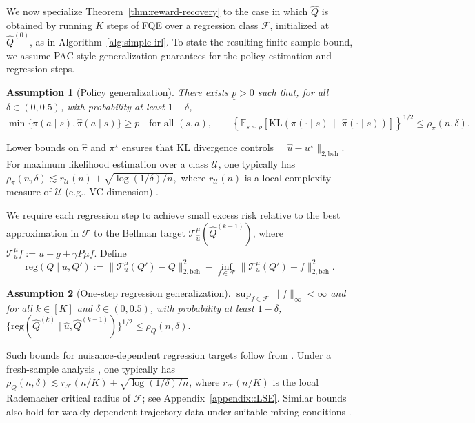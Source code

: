 \documentclass{article}
\newtheorem{assumption}{Assumption}
\newcommand{\E}{\mathbb{E}}
\newcommand{\1}{\mathbbm{1}}
\begin{document}
We now specialize Theorem~\ref{thm:reward-recovery} to the case in which
\(\hat Q\) is obtained by running \(K\) steps of FQE over a regression class
\(\mathcal F\), initialized at \(\hat Q^{(0)}\), as in
Algorithm~\ref{alg:simple-irl}. To state the resulting finite-sample bound, we
assume PAC-style generalization guarantees for the policy-estimation and
regression steps.
\begin{assumption}[Policy generalization]
\label{assump:policy-gen}
There exists \(\underline p>0\) such that, for all \(\delta\in(0,0.5)\), with
probability at least \(1-\delta\),
\[
\min\{\pi(a\mid s),\hat\pi(a\mid s)\}\ge \underline p
\quad\text{for all }(s,a),
\qquad
\left\{
\E_{s\sim\rho}\!\left[
\mathrm{KL}\!\left(\pi(\cdot\mid s)\,\|\,\hat\pi(\cdot\mid s)\right)
\right]
\right\}^{1/2}
\le
\rho_\pi(n,\delta).
\]
\end{assumption}
Lower bounds on \(\hat \pi\) and \(\pi^\star\) ensures that KL divergence controls \(\|\hat u-u^\star\|_{2,\mathrm{beh}}\). For maximum likelihood estimation over a class \(\mathcal U\), one typically has \(\rho_\pi(n,\delta)\lesssim r_{\mathcal U}(n)+\sqrt{\log(1/\delta)/n},\) where \(r_{\mathcal U}(n)\) is a local complexity measure of \(\mathcal U\) (e.g., VC dimension)  \citep{geer2000empirical,wainwright2019high}.

We require each regression step to achieve small excess risk relative to the best approximation in \(\mathcal F\) to the Bellman target \(\mathcal T_{\hat u}^\mu(\hat Q^{(k-1)})\), where \(\mathcal T_u^\mu f:=u-g+\gamma P\mu f\). Define
\[
\mathrm{reg}(Q\mid u,Q')
:=
\|\mathcal T_u^\mu(Q')-Q\|_{2,\mathrm{beh}}^2
-
\inf_{f\in\mathcal F}\|\mathcal T_u^\mu(Q')-f\|_{2,\mathrm{beh}}^2.
\]

\begin{assumption}[One-step regression generalization]
\label{assump:q-gen}
$\sup_{f \in \mathcal{F}} \|f\|_{\infty} < \infty $ and for all \(k\in[K]\) and \(\delta\in(0,0.5)\), with probability at least
\(1-\delta\), $\{\mathrm{reg}(\hat Q^{(k)}\mid \hat u,\hat Q^{(k-1)})\}^{1/2}
\le
\rho_{Q}(n,\delta).$
\end{assumption}
Such bounds for nuisance-dependent regression targets follow from
\citet{foster2023orthogonal,van2026researcher}. Under a fresh-sample analysis
\citep{munos2008finite}, one typically has
\(\rho_{Q}(n,\delta)\lesssim r_{\mathcal F}(n/K)+\sqrt{\log(1/\delta)/n}\),
where \(r_{\mathcal F}(n/K)\) is the local Rademacher critical radius of
\(\mathcal F\); see Appendix~\ref{appendix::LSE}. Similar bounds also hold for
weakly dependent trajectory data under suitable mixing conditions
\citep{yu1994rates,mohri2010stability}.
\end{document}

